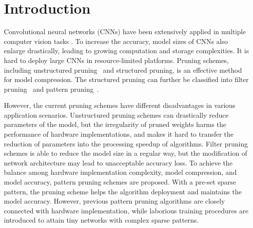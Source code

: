 \documentclass[journal,article,submit,pdftex,moreauthors]{Definitions/mdpi}
\begin{document}



\section{Introduction}\label{sec: intro}

Convolutional neural networks (CNNs) have been extensively applied in multiple computer vision tasks \cite{yolov3,deeplabv3,mask-rcnn}. To increase the accuracy, model sizes of CNNs also enlarge drastically, leading to growing computation and storage complexities. It is hard to deploy large CNNs in resource-limited platforms. Pruning schemes, including unstructured pruning~\cite{M16,ADMM} and structured pruning, is an effective method for model compression. The structured pruning can further be classified into filter pruning~\cite{SFT} and pattern pruning~\cite{banksparse,ese}.

However, the current pruning schemes have different disadvantages in various application scenarios. Unstructured pruning schemes can drastically reduce parameters of the model, but the irregularity of pruned weights harms the performance of hardware implementations, and makes it hard to transfer the reduction of parameters into the processing speedup of algorithms. Filter pruning schemes is able to reduce the model size in a regular way, but the modification of network architecture may lead to unacceptable accuracy loss. To achieve the balance among hardware implementation complexity, model compression, and model accuracy, pattern pruning schemes are proposed. With a pre-set sparse pattern, the pruning scheme helps the algorithm deployment and maintains the model accuracy. However, previous pattern pruning algorithms are closely connected with hardware implementation, while laborious training procedures are introduced to attain tiny networks with complex sparse patterns.
\end{document}
